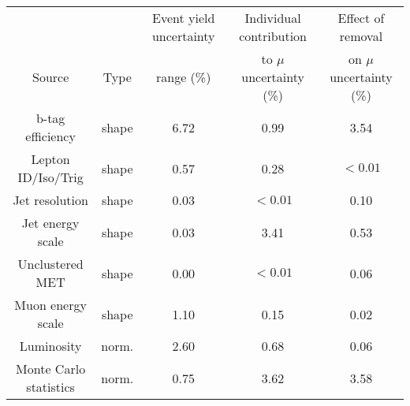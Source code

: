  \begin{adjustbox}{width=\textwidth,center=\textwidth}
\begin{tabular}{ccccc} \hline \hline
&  & Event yield uncertainty &Individual contribution & Effect of removal  \\
Source & Type & range (\%) &  to $\mu$ uncertainty (\%) & on $\mu$ uncertainty (\%) \\ \hline 
b-tag efficiency & shape & 6.72 & 0.99 & 3.54\\
Lepton ID/Iso/Trig & shape & 0.57 & 0.28 & $<0.01$\\
Jet resolution & shape & 0.03 & $<0.01$ & 0.10\\
Jet energy scale & shape & 0.03 & 3.41 & 0.53\\
Unclustered MET & shape & 0.00 & $<0.01$ & 0.06\\
Muon energy scale & shape & 1.10 & 0.15 & 0.02\\
Luminosity & norm. & 2.60 & 0.68 & 0.06\\
Monte Carlo statistics & norm. & 0.75 & 3.62 & 3.58\\
\hline 
\end{tabular}
 \end{adjustbox}

